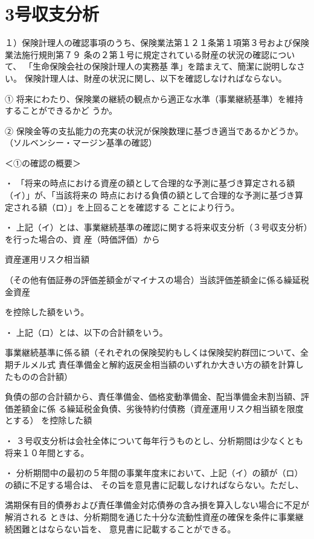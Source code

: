 \documentclass[report,gutter=10mm,fore-edge=10mm,uplatex,dvipdfmx]{jlreq}
\begin{document}
\section{3号収支分析}

１）保険計理人の確認事項のうち、保険業法第１２１条第１項第３号および保険業法施行規則第７９
条の２第１号に規定されている財産の状況の確認について、
「生命保険会社の保険計理人の実務基
準」を踏まえて、簡潔に説明しなさい。
\answer{}
保険計理人は、財産の状況に関し、以下を確認しなければならない。

① 将来にわたり、保険業の継続の観点から適正な水準（事業継続基準）を維持することができるかど
うか。

② 保険金等の支払能力の充実の状況が保険数理に基づき適当であるかどうか。
（ソルベンシー・マージン基準の確認）

＜①の確認の概要＞

・ 「将来の時点における資産の額として合理的な予測に基づき算定される額（イ）」が、「当該将来の
時点における負債の額として合理的な予測に基づき算定される額（ロ）」を上回ることを確認する
ことにより行う。

・ 上記（イ）とは、事業継続基準の確認に関する将来収支分析（３号収支分析）を行った場合の、資
産（時価評価）から

資産運用リスク相当額

（その他有価証券の評価差額金がマイナスの場合）当該評価差額金に係る繰延税金資産

を控除した額をいう。

・ 上記（ロ）とは、以下の合計額をいう。

事業継続基準に係る額（それぞれの保険契約もしくは保険契約群団について、全期チルメル式
責任準備金と解約返戻金相当額のいずれか大きい方の額を計算したものの合計額）

負債の部の合計額から、責任準備金、価格変動準備金、配当準備金未割当額、評価差額金に係
る繰延税金負債、劣後特約付債務（資産運用リスク相当額を限度とする） を控除した額

・ ３号収支分析は会社全体について毎年行うものとし、分析期間は少なくとも将来１０年間とする。

・ 分析期間中の最初の５年間の事業年度末において、上記（イ）の額が（ロ）の額に不足する場合は、
その旨を意見書に記載しなければならない。ただし、


満期保有目的債券および責任準備金対応債券の含み損を算入しない場合に不足が解消される
ときは、分析期間を通じた十分な流動性資産の確保を条件に事業継続困難とはならない旨を、
意見書に記載することができる。
\end{document}

